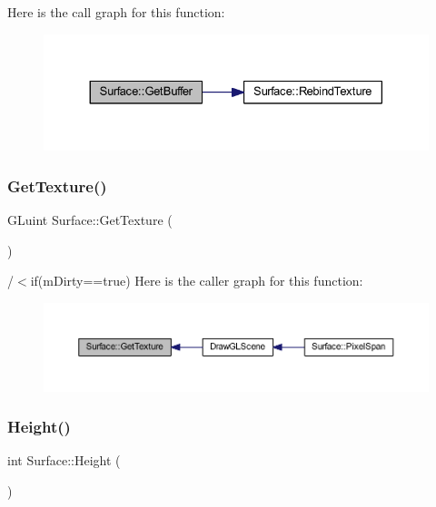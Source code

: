 Here is the call graph for this function\+:\nopagebreak
\begin{figure}[H]
\begin{center}
\leavevmode
\includegraphics[width=330pt]{class_surface_a8f8da8f3ee82b8e657916f40b3f40eff_cgraph}
\end{center}
\end{figure}
\mbox{\label{class_surface_a2cd8789d26457187b8af4be8c178e9d4}} 
\subsubsection{\texorpdfstring{Get\+Texture()}{GetTexture()}}
{\footnotesize\ttfamily G\+Luint Surface\+::\+Get\+Texture (\begin{DoxyParamCaption}{ }\end{DoxyParamCaption})}

/$<$if(m\+Dirty==true) Here is the caller graph for this function\+:\nopagebreak
\begin{figure}[H]
\begin{center}
\leavevmode
\includegraphics[width=350pt]{class_surface_a2cd8789d26457187b8af4be8c178e9d4_icgraph}
\end{center}
\end{figure}
\mbox{\label{class_surface_ab901f48d51b3fd427415b580dc15518c}} 
\subsubsection{\texorpdfstring{Height()}{Height()}}
{\footnotesize\ttfamily int Surface\+::\+Height (\begin{DoxyParamCaption}{ }\end{DoxyParamCaption})\hspace{0.3cm}{\ttfamily [inline]}}

